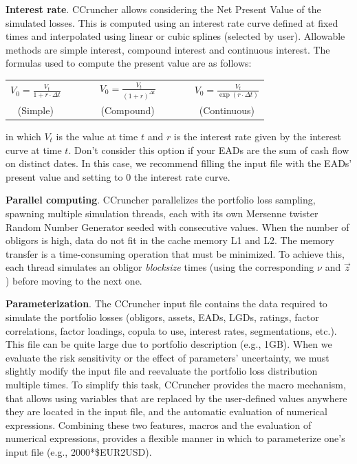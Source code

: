 \documentclass[11pt,fleqn]{book} %
\begin{document}
\textbf{Interest rate}. CCruncher allows considering the Net Present Value 
of the simulated losses. This is computed using an interest rate curve 
defined at fixed times and interpolated using linear or cubic splines 
(selected by user). Allowable methods are simple interest, compound interest 
and continuous interest. The formulas used to compute the present value are
as follows:
\begin{center}
	\begin{tabular}{ccccc}
		$V_0 = \frac{V_t}{1+r \cdot \Delta t}$ & $\qquad$ &
		$V_0 = \frac{V_t}{(1+r)^{\Delta t}}$ & $\qquad$ &
		$V_0 = \frac{V_t}{\exp(r \cdot \Delta t)}$ \\
		(Simple) & $\qquad$ & (Compound) & $\qquad$ & (Continuous)
	\end{tabular}
\end{center}
in which $V_t$ is the value at time $t$ and $r$ is the interest rate given 
by the interest curve at time $t$. Don't consider this option if your EADs
are the sum of cash flow on distinct dates. In this case, we recommend 
filling the input file with the EADs' present value and setting to $0$ the 
interest rate curve.

\textbf{Parallel computing}. 
CCruncher parallelizes the portfolio loss sampling, spawning multiple 
simulation threads, each with its own Mersenne twister Random Number 
Generator seeded with consecutive values. When the number of obligors is 
high, data do not fit in the cache memory L1 and L2. The memory transfer is 
a time-consuming operation that must be minimized. To achieve this, each
thread simulates an obligor \emph{blocksize} times (using the corresponding 
$\nu$ and $\vec{z}$) before moving to the next one.

\textbf{Parameterization}. 
The CCruncher input file contains the data required to simulate the portfolio
losses (obligors, assets, EADs, LGDs, ratings, factor correlations, factor
loadings, copula to use, interest rates, segmentations, etc.). This file can 
be quite large due to portfolio description (e.g., 1GB). When we evaluate the 
risk sensitivity or the effect of parameters' uncertainty, we must slightly 
modify the input file and reevaluate the portfolio loss distribution multiple 
times. To simplify this task, CCruncher provides the macro mechanism, that 
allows using variables that are replaced by the user-defined values anywhere 
they are located in the input file, and the automatic evaluation of numerical 
expressions. Combining these two features, macros and the evaluation of 
numerical expressions, provides a flexible manner in which to parameterize 
one's input file (e.g., 2000*\$EUR2USD). 
\end{document}
